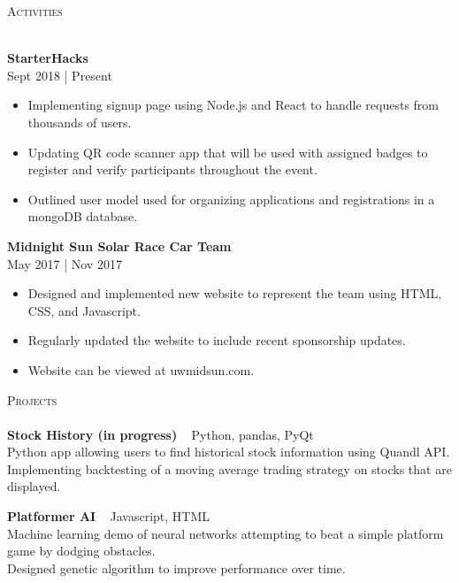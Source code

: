 \documentclass[a4paper]{article}
\newcommand{\lineunder} {
    \vspace*{-8pt} \\
    \hspace*{-18pt} \hrulefill \\
}
\newcommand{\header} [1] {
    {\hspace*{-18pt}\vspace*{6pt} \textsc{#1}}
    \vspace*{-6pt} \lineunder
}
\begin{document}
\header{Activities}
\vspace{1mm}

\textbf{StarterHacks} \hfill \\
 \hfill Sept 2018 | Present\\
\vspace{-1mm}
\begin{itemize} \itemsep 1pt
    \item Implementing signup page using Node.js and React to handle requests from thousands of users.
    \item Updating QR code scanner app that will be used with assigned badges to register and verify participants throughout the event.
    \item Outlined user model used for organizing applications and registrations in a mongoDB database.
\end{itemize}

\textbf{Midnight Sun Solar Race Car Team}\\
 \hfill May 2017 | Nov 2017\\
\vspace{-1mm}
\begin{itemize} \itemsep 1pt
	\item Designed and implemented new website to represent the team using HTML, CSS, and Javascript.
	\item Regularly updated the website to include recent sponsorship updates.
	\item Website can be viewed at uwmidsun.com.
\end{itemize}

\header{Projects}
{\textbf{Stock History (in progress)}} {\ \textbar{} Python, pandas, PyQt } \\
Python app allowing users to find historical stock information using Quandl API.\\
Implementing backtesting of a moving average trading strategy on stocks that are displayed.\\
\vspace*{2mm}

{\textbf{Platformer AI}} {\ \textbar{} Javascript, HTML} \\
Machine learning demo of neural networks attempting to beat a simple platform game by dodging obstacles.\\
Designed genetic algorithm to improve performance over time.\\
\vspace*{2mm}
\end{document}
